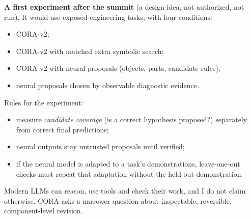 \documentclass[11pt]{article}
\begin{document}
\textbf{A first experiment after the summit} (a design idea, not authorized, not run). It would use exposed engineering
tasks, with four conditions:
\begin{itemize}
  \item CORA-v2;
  \item CORA-v2 with matched extra symbolic search;
  \item CORA-v2 with neural proposals (objects, parts, candidate rules);
  \item neural proposals chosen by observable diagnostic evidence.
\end{itemize}
Rules for the experiment:
\begin{itemize}
  \item measure \emph{candidate coverage} (is a correct hypothesis proposed?) separately from correct final
        predictions;
  \item neural outputs stay untrusted proposals until verified;
  \item if the neural model is adapted to a task's demonstrations, leave-one-out checks must repeat that adaptation
        without the held-out demonstration.
\end{itemize}
Modern LLMs can reason, use tools and check their work, and I do not claim otherwise. CORA asks a narrower question
about inspectable, reversible, component-level revision.
\end{document}

